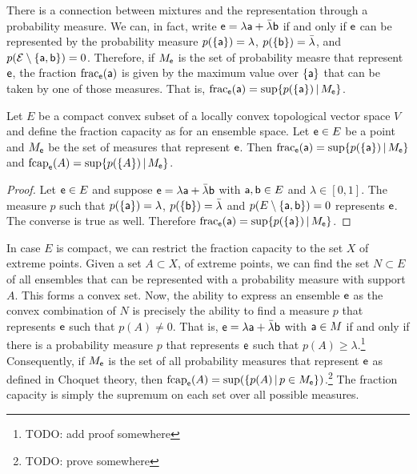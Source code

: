 There is a connection between mixtures and the representation through a probability measure. We can, in fact, write $\ens = \lambda \ens[a] + \bar{\lambda} \ens[b]$ if and only if $\ens$ can be represented by the probability measure $p(\{\ens[a]\}) = \lambda$, $p(\{\ens[b]\}) = \bar{\lambda}$, and $p(\Ens \setminus \{\ens[a], \ens[b]\}) = 0$. Therefore, if $M_{\ens}$ is the set of probability measre that represent $\ens$, the fraction $\fraction_{\ens}(\ens[a])$ is given by the maximum value over $\{\ens[a]\}$ that can be taken by one of those measures. That is,  $\fraction_{\ens}(\ens[a]) = \sup \{ p(\{\ens[a]\}) \, | \, M_{\ens} \}$.

\begin{prop}
	Let $E$ be a compact convex subset of a locally convex topological vector space $V$ and define the fraction capacity as for an ensemble space. Let $\ens \in E$ be a point and $M_{\ens}$ be the set of measures that represent $\ens$. Then $\fraction_{\ens}(\ens[a]) = \sup \{ p(\{\ens[a]\}) \, | \, M_{\ens} \}$ and $\fcap_{\ens}(A) = \sup \{ p(\{A\}) \, | \, M_{\ens} \}$.
\end{prop}

\begin{proof}
	Let $\ens \in E$ and suppose $\ens = \lambda \ens[a] + \bar{\lambda} \ens[b]$ with $\ens[a], \ens[b] \in E$ and $\lambda \in [0,1]$. The measure $p$ such that $p(\{\ens[a]\}) = \lambda$, $p(\{\ens[b]\}) = \bar{\lambda}$ and $p(E\setminus \{ \ens[a], \ens[b]\})=0$ represents $\ens$. The converse is true as well. Therefore $\fraction_{\ens}(\ens[a]) = \sup \{ p(\{\ens[a]\}) \, | \, M_{\ens} \}$. 
\end{proof}


In case $E$ is compact, we can restrict the fraction capacity to the set $X$ of extreme points. Given a set $A \subset X$, of extreme points, we can find the set $N \subset E$ of all ensembles that can be represented with a probability measure with support $A$. This forms a convex set. Now, the ability to express an ensemble $\ens$ as the convex combination of $N$ is precisely the ability to find a measure $p$ that represents $\ens$ such that $p(A) \neq 0$. That is, $\ens = \lambda \ens[a] + \bar{\lambda} \ens[b]$ with $\ens[a] \in M$ if and only if there is a probability measure $p$ that represents $\ens$ such that $p(A) \geq \lambda$.\footnote{TODO: add proof somewhere} Consequently, if $M_{\ens}$ is the set of all probability measures that represent $\ens$ as defined in Choquet theory, then $\fcap_{\ens}(A) = \sup(\{p(A) \, | \, p \in M_{\ens}\})$.\footnote{TODO: prove somewhere} The fraction capacity is simply the supremum on each set over all possible measures.

